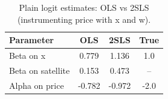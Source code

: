 \begin{table}[H]
\centering
\caption{Plain logit estimates: OLS vs 2SLS (instrumenting price with x and w).}
\begin{tabular}{lccc}
\toprule
Parameter & OLS & 2SLS & True\\
\midrule
Beta on x & 0.779 & 1.136 & 1.0\\
Beta on satellite & 0.153 & 0.473 & --\\
Alpha on price & -0.782 & -0.972 & -2.0\\
\bottomrule
\end{tabular}
\end{table}
